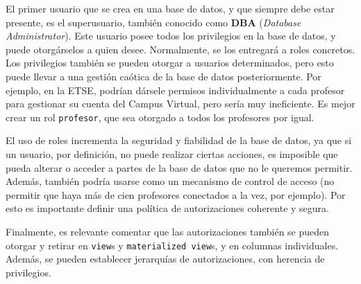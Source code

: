\documentclass[12pt, a4paper]{article}
\begin{document}
El primer usuario que se crea en una base de datos, y que siempre debe estar presente, es el superusuario, también conocido como \textbf{DBA} (\textit{Database Administrator}). Este usuario posee todos los privilegios en la base de datos, y puede otorgárselos a quien desee. Normalmente, se los entregará a roles concretos. Los privilegios también se pueden otorgar a usuarios determinados, pero esto puede llevar a una gestión caótica de la base de datos posteriormente. Por ejemplo, en la ETSE, podrían dársele permisos individualmente a cada profesor para gestionar su cuenta del Campus Virtual, pero sería muy ineficiente. Es mejor crear un rol \texttt{profesor}, que sea otorgado a todos los profesores por igual.

El uso de roles incrementa la seguridad y fiabilidad de la base de datos, ya que si un usuario, por definición, no puede realizar ciertas acciones, es imposible que pueda alterar o acceder a partes de la base de datos que no le queremos permitir. Además, también podría usarse como un mecanismo de control de acceso (no permitir que haya más de cien profesores conectados a la vez, por ejemplo). Por esto es importante definir una política de autorizaciones coherente y segura.

Finalmente, es relevante comentar que las autorizaciones también se pueden otorgar y retirar en \texttt{view}s y \texttt{materialized view}s, y en columnas individuales. Además, se pueden establecer jerarquías de autorizaciones, con herencia de privilegios.

\nocite{*}

\end{document}
